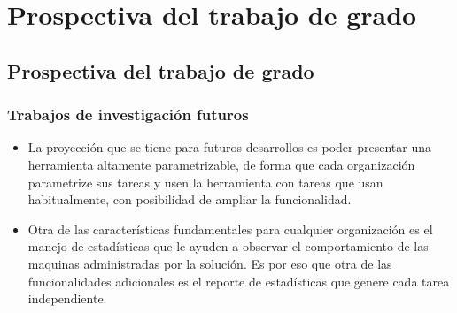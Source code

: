 \chapter{Prospectiva del trabajo de grado}
\newpage
\section{Prospectiva del trabajo de grado}
\subsection{Trabajos de investigación futuros}
\begin{itemize}
    \item La proyección que se tiene para futuros desarrollos es poder presentar una herramienta altamente parametrizable, de forma que cada organización parametrize sus tareas y usen la herramienta con tareas que usan habitualmente, con posibilidad de ampliar la funcionalidad.
    \item Otra de las características fundamentales para cualquier organización es el manejo de estadísticas que le ayuden a observar el comportamiento de las maquinas administradas por la solución. Es por eso que otra de las funcionalidades adicionales es el reporte de estadísticas que genere cada tarea independiente.
\end{itemize}